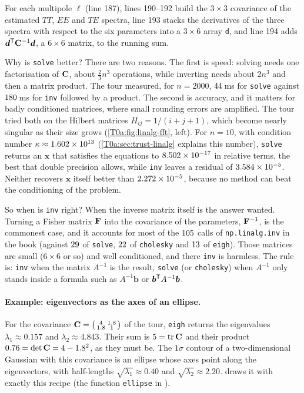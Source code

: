 
For each multipole $\ell$ (line 187), lines 190--192 build the $3\times3$ covariance of the estimated $TT$, $EE$ and $TE$ spectra, line 193 stacks the derivatives of the three spectra with respect to the six parameters into a $3\times6$ array \texttt{d}, and line 194 adds $\bm d^{\mathsf{T}}\mathbf{C}^{-1}\bm d$, a $6\times6$ matrix, to the running sum.

Why is \texttt{solve} better? There are two reasons. The first is speed: solving needs one factorisation of $\mathbf{C}$, about $\tfrac23n^3$ operations, while inverting needs about $2n^3$ and then a matrix product. The tour measured, for $n=2000$, $44$\,ms for \texttt{solve} against $180$\,ms for \texttt{inv} followed by a product. The second is accuracy, and it matters for badly conditioned matrices, where small rounding errors are amplified. The tour tried both on the Hilbert matrices $H_{ij}=1/(i+j+1)$, which become nearly singular as their size grows (\cref{T0a:fig:linalg-fft}, left). For $n=10$, with condition number $\kappa\approx1.602\times10^{13}$ (\cref{T0a:sec:trust-linalg} explains this number), \texttt{solve} returns an $\bm x$ that satisfies the equations to $8.502\times10^{-17}$ in relative terms, the best that double precision allows, while \texttt{inv} leaves a residual of $3.584\times10^{-5}$. Neither recovers $\bm x$ itself better than $2.272\times10^{-5}$, because no method can beat the conditioning of the problem.

So when is \texttt{inv} right? When the inverse matrix itself is the answer wanted. Turning a Fisher matrix $\mathbf{F}$ into the covariance of the parameters, $\mathbf{F}^{-1}$, is the commonest case, and it accounts for most of the $105$ calls of \texttt{np.linalg.inv} in the book (against $29$ of \texttt{solve}, $22$ of \texttt{cholesky} and $13$ of \texttt{eigh}). Those matrices are small ($6\times6$ or so) and well conditioned, and there \texttt{inv} is harmless. The rule is: \texttt{inv} when the matrix $A^{-1}$ is the result, \texttt{solve} (or \texttt{cholesky}) when $A^{-1}$ only stands inside a formula such as $A^{-1}\bm b$ or $\bm b^{\mathsf{T}} A^{-1}\bm b$.

\paragraph{Example: eigenvectors as the axes of an ellipse.} For the covariance $\mathbf{C}=\bigl(\begin{smallmatrix}4&1.8\\1.8&1\end{smallmatrix}\bigr)$ of the tour, \texttt{eigh} returns the eigenvalues $\lambda_1\approx0.157$ and $\lambda_2\approx4.843$. Their sum is $5=\operatorname{tr}\mathbf{C}$ and their product $0.76=\det\mathbf{C}=4-1.8^2$, as they must be. The $1\sigma$ contour of a two-dimensional Gaussian with this covariance is an ellipse whose axes point along the eigenvectors, with half-lengths $\sqrt{\lambda_1}\approx0.40$ and $\sqrt{\lambda_2}\approx2.20$.  draws it with exactly this recipe (the function \texttt{ellipse} in ).

